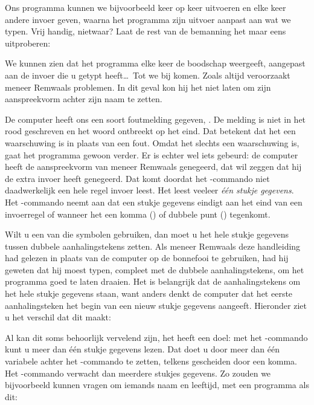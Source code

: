 \needspace{4cm}
Ons programma kunnen we bijvoorbeeld keer op keer uitvoeren en elke keer andere invoer geven, waarna het programma zijn uitvoer aanpast aan wat we typen. Vrij handig, nietwaar? Laat de rest van de bemanning het maar eens uitproberen:


We kunnen zien dat het programma elke keer de boodschap weergeeft, aangepast aan de invoer die u getypt heeft\ldots\  Tot we bij  komen. Zoals altijd veroorzaakt meneer Remwaals problemen. In dit geval kon hij het niet laten om zijn aanspreekvorm achter zijn naam te zetten.

De computer heeft ons een soort foutmelding gegeven, . De melding is niet in het rood geschreven en het woord  ontbreekt op het eind. Dat betekent dat het een waarschuwing is in plaats van een fout. Omdat het slechts een waarschuwing is, gaat het programma gewoon verder. Er is echter wel iets gebeurd: de computer heeft de aanspreekvorm  van meneer Remwaals genegeerd, dat wil zeggen dat hij de extra invoer heeft genegeerd. Dat komt doordat het -commando niet daadwerkelijk een hele regel invoer leest. Het leest veeleer {\em één stukje gegevens}. Het -commando neemt aan dat een stukje gegevens eindigt aan het eind van een invoerregel of wanneer het een komma (\stw{,}) of dubbele punt (\stw{:}) tegenkomt.

\needspace{4cm}
Wilt u een van die symbolen gebruiken, dan moet u het hele stukje gegevens tussen dubbele aanhalingstekens zetten. Als meneer Remwaals deze handleiding had gelezen in plaats van de computer op de bonnefooi te gebruiken, had hij geweten dat hij  moest typen, compleet met de dubbele aanhalingstekens, om het programma goed te laten draaien. Het is belangrijk dat de aanhalingstekens om het hele stukje gegevens staan, want anders denkt de computer dat het eerste aanhalingsteken het begin van een nieuw stukje gegevens aangeeft. Hieronder ziet u het verschil dat dit maakt:


\needspace{1.5cm}
Al kan dit soms behoorlijk vervelend zijn, het heeft een doel: met het -commando kunt u meer dan één stukje gegevens lezen. Dat doet u door meer dan één variabele achter het -commando te zetten, telkens gescheiden door een komma. Het -commando verwacht dan meerdere stukjes gegevens. Zo zouden we bijvoorbeeld kunnen vragen om iemands naam en leeftijd, met een programma als dit:

